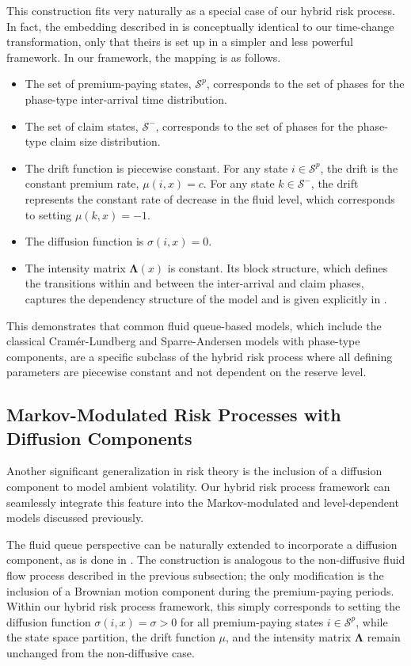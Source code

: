 \documentclass[11pt]{article}
\numberwithin{table}{section}
\numberwithin{figure}{section}
\numberwithin{equation}{section}
\newcommand{\1}{{\mathbf 1}}
\newcommand{\0}{\mat{0}}
\begin{document}
This construction fits very naturally as a special case of our hybrid risk process. In fact, the embedding described in \cite{bladt2019parisian} is conceptually identical to our time-change transformation, only that theirs is set up in a simpler and less powerful framework. In our framework, the mapping is as follows.
\begin{itemize}
    \item The set of premium-paying states, \(\mathcal{S}^p\), corresponds to the set of phases for the phase-type inter-arrival time distribution.
    \item The set of claim states, \(\mathcal{S}^-\), corresponds to the set of phases for the phase-type claim size distribution.
    \item The drift function is piecewise constant. For any state \(i \in \mathcal{S}^p\), the drift is the constant premium rate, \(\mu(i,x) = c\). For any state \(k \in \mathcal{S}^-\), the drift represents the constant rate of decrease in the fluid level, which corresponds to setting \(\mu(k,x) = -1\).
    \item The diffusion function is \(\sigma(i,x) = 0\).
    \item The intensity matrix \(\bm{\Lambda}(x)\) is constant. Its block structure, which defines the transitions within and between the inter-arrival and claim phases, captures the dependency structure of the model and is given explicitly in \cite{bladt2019parisian}.
\end{itemize}

This demonstrates that common fluid queue-based models, which include the classical Cramér-Lundberg and Sparre-Andersen models with phase-type components, are a specific subclass of the hybrid risk process where all defining parameters are piecewise constant and not dependent on the reserve level.

\subsection{Markov-Modulated Risk Processes with Diffusion Components}

Another significant generalization in risk theory is the inclusion of a diffusion component to model ambient volatility. Our hybrid risk process framework can seamlessly integrate this feature into the Markov-modulated and level-dependent models discussed previously.

The fluid queue perspective can be naturally extended to incorporate a diffusion component, as is done in \cite{bladt2019parisian}. The construction is analogous to the non-diffusive fluid flow process described in the previous subsection; the only modification is the inclusion of a Brownian motion component during the premium-paying periods. Within our hybrid risk process framework, this simply corresponds to setting the diffusion function \(\sigma(i,x) = \sigma > 0\) for all premium-paying states \(i \in \mathcal{S}^p\), while the state space partition, the drift function \(\mu\), and the intensity matrix \(\bm{\Lambda}\) remain unchanged from the non-diffusive case.
\end{document}
